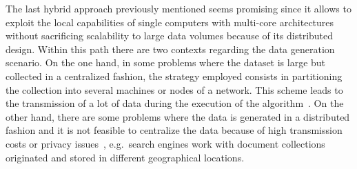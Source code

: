 \documentclass[10pt]{article}
\begin{document}
The last hybrid approach previously mentioned seems promising since it allows to exploit the local capabilities of single computers with multi-core architectures without sacrificing scalability to large data volumes because of its distributed design. Within this path there are two contexts regarding the data generation scenario. 
On the one hand, in some problems where the dataset is large but collected in a centralized fashion, the strategy employed consists in partitioning the collection into several machines or nodes of a network. 
This scheme leads to the transmission of a lot of data during the execution of the algorithm~\citep{N15}. On the other hand, there are some problems where the data is generated in a distributed fashion and it is not feasible to centralize the data because of high transmission costs or privacy issues~\citep{JW05,LHLX12}, e.g.\  search engines  work with document collections originated and stored in different geographical locations.
\end{document}
